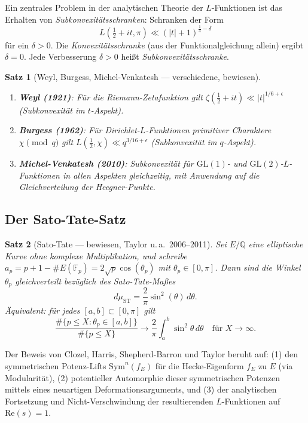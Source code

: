 \documentclass[12pt,a4paper]{amsart}
\newtheorem{theorem}{Satz}[section]
\theoremstyle{definition}
\newcommand{\QQ}{\mathbb{Q}}
\newcommand{\FF}{\mathbb{F}}
\newcommand{\GL}{\mathrm{GL}}
\newcommand{\re}{\mathrm{Re}}
\begin{document}
Ein zentrales Problem in der analytischen Theorie der $L$-Funktionen ist das Erhalten
von \emph{Subkonvexitätsschranken}: Schranken der Form
\[
L(\tfrac{1}{2} + it, \pi) \ll (|t| + 1)^{\frac{1}{4} - \delta}
\]
für ein $\delta > 0$. Die \emph{Konvexitätsschranke} (aus der Funktionalgleichung allein)
ergibt $\delta = 0$. Jede Verbesserung $\delta > 0$ heißt \emph{Subkonvexitätsschranke}.

\begin{theorem}[Weyl, Burgess, Michel-Venkatesh — verschiedene, bewiesen]
\begin{enumerate}[label=(\roman*)]
\item \textbf{Weyl (1921)}: Für die Riemann-Zetafunktion gilt
  $\zeta(\frac{1}{2}+it) \ll |t|^{1/6+\epsilon}$ (Subkonvexität im $t$-Aspekt).
\item \textbf{Burgess (1962)}: Für Dirichlet-$L$-Funktionen primitiver Charaktere
  $\chi \pmod{q}$ gilt $L(\frac{1}{2}, \chi) \ll q^{3/16+\epsilon}$ (Subkonvexität
  im $q$-Aspekt).
\item \textbf{Michel-Venkatesh (2010)}: Subkonvexität für $\GL(1)$- und $\GL(2)$-$L$-Funktionen
  in allen Aspekten gleichzeitig, mit Anwendung auf die Gleichverteilung der Heegner-Punkte.
\end{enumerate}
\end{theorem}

\subsection{Der Sato-Tate-Satz}

\begin{theorem}[Sato-Tate — bewiesen, Taylor u.\,a.\ 2006--2011]
\label{satz:sato_tate}
Sei $E/\QQ$ eine elliptische Kurve ohne komplexe Multiplikation, und schreibe
$a_p = p + 1 - \#E(\FF_p) = 2\sqrt{p}\cos(\theta_p)$ mit $\theta_p \in [0,\pi]$.
Dann sind die Winkel $\theta_p$ gleichverteilt bezüglich des Sato-Tate-Maßes
\[
d\mu_{\mathrm{ST}} = \frac{2}{\pi}\sin^2(\theta)\, d\theta.
\]
Äquivalent: für jedes $[a,b] \subset [0,\pi]$ gilt
\[
\frac{\#\{p \leq X : \theta_p \in [a,b]\}}{\#\{p \leq X\}} \longrightarrow \frac{2}{\pi} \int_a^b \sin^2\theta\, d\theta
\quad \text{für } X \to \infty.
\]
\end{theorem}

Der Beweis von Clozel, Harris, Shepherd-Barron und Taylor beruht auf:
(1) den symmetrischen Potenz-Lifts $\mathrm{Sym}^n(f_E)$ für die Hecke-Eigenform
$f_E$ zu $E$ (via Modularität), (2) potentieller Automorphie dieser symmetrischen
Potenzen mittels eines neuartigen Deformationsarguments, und (3) der analytischen
Fortsetzung und Nicht-Verschwindung der resultierenden $L$-Funktionen auf $\re(s) = 1$.
\end{document}

